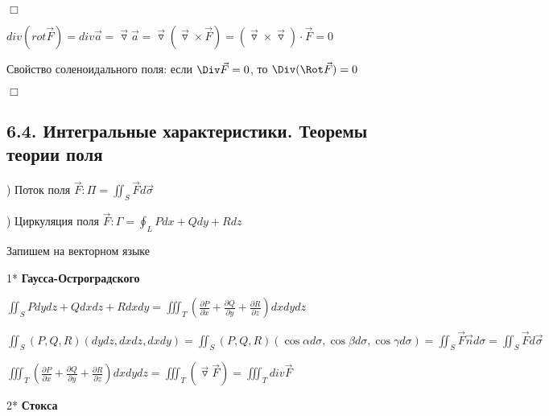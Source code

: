 \documentclass[12pt]{article}
\begin{document}
    $\Box$

    $div (rot \overrightarrow{F}) = div \overrightarrow{a} = \overrightarrow{\triangledown} \overrightarrow{a} = \overrightarrow{\triangledown} (\overrightarrow{\triangledown} \times \overrightarrow{F}) = (\overrightarrow{\triangledown} \times \overrightarrow{\triangledown}) \cdot \overrightarrow{F} = 0$
    \begin{MyTheorem}
         Свойство соленоидального поля: если $\Div \vec{F} = 0$, то $\Div (\Rot \vec{F}) = 0$
    \end{MyTheorem}

    $\Box$

    \hypertarget{integralcharacteristics}{}

    \subsection{6.4. Интегральные характеристики. Теоремы теории поля}

    ) Поток поля $\overrightarrow{F}: \Pi = \iint_S \overrightarrow{F}d\overrightarrow{\sigma}$

    ) Циркуляция поля $\overrightarrow{F}: \Gamma = \oint_L Pdx + Qdy + Rdz$

    \Nota Запишем \Ths на векторном языке

    \hypertarget{theoremGaussOstrogradskyyinvectorform}{}

    1* \textbf{Гаусса-Остроградского}

    $\iint_S Pdydz + Qdxdz + Rdxdy = \iiint_T \left(\frac{\partial P}{\partial x} + \frac{\partial Q}{\partial y} + \frac{\partial R}{\partial z}\right) dxdydz$

    $\iint_S (P, Q, R) (dydz, dxdz, dxdy) = \iint_S (P, Q, R) (\cos\alpha d\sigma, \cos\beta d\sigma, \cos\gamma d\sigma) =
    \iint_S \overrightarrow{F} \overrightarrow{n} d\sigma = \iint_S \overrightarrow{F} d\overrightarrow{\sigma}$

    $\iiint_T \left(\frac{\partial P}{\partial x} + \frac{\partial Q}{\partial y} + \frac{\partial R}{\partial z}\right) dxdydz = \iiint_T (\overrightarrow{\triangledown} \overrightarrow{F}) = \iiint_T div \overrightarrow{F}$


    \mediumvspace

    \hypertarget{theoremStokesinvectorform}{}

    2* \textbf{Стокса}
\end{document}
